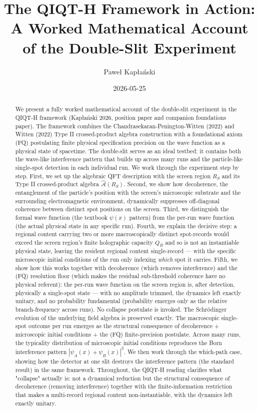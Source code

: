 \documentclass[11pt,a4paper]{article}
\title{The QIQT-H Framework in Action: A Worked Mathematical Account of the Double-Slit Experiment}
\author{Paweł Kapłański}
\date{2026-05-25}
\begin{document}
\maketitle

\begin{abstract}
\noindent We present a fully worked mathematical account of the double-slit experiment in the QIQT-H framework (Kapłański 2026, position paper and companion foundations paper). The framework combines the Chandrasekaran-Penington-Witten (2022) and Witten (2022) Type II crossed-product algebra construction with a foundational axiom (FQ) postulating finite physical specification precision on the wave function as a physical state of spacetime. The double-slit serves as an ideal testbed: it contains both the wave-like interference pattern that builds up across many runs and the particle-like single-spot detection in each individual run. We work through the experiment step by step. First, we set up the algebraic QFT description with the screen region $R_S$ and its Type II crossed-product algebra $\hat{\mathcal{A}}(R_S)$. Second, we show how decoherence, the entanglement of the particle's position with the screen's microscopic substrate and the surrounding electromagnetic environment, dynamically suppresses off-diagonal coherence between distinct spot positions on the screen. Third, we distinguish the formal wave function (the textbook $\psi(x)$ pattern) from the per-run wave function (the actual physical state in any specific run). Fourth, we explain the decisive step: a regional content carrying two or more macroscopically distinct spot-records would exceed the screen region's finite holographic capacity $Q_R$ and so is not an instantiable physical state, leaving the resident regional content single-record — with the specific microscopic initial conditions of the run only indexing \emph{which} spot it carries. Fifth, we show how this works together with decoherence (which removes interference) and the (FQ) resolution floor (which makes the residual sub-threshold coherence have no physical referent): the per-run wave function on the screen region is, after detection, physically a single-spot state — with no amplitude trimmed, the dynamics left exactly unitary, and no probability fundamental (probability emerges only as the relative branch-frequency across runs). No collapse postulate is invoked. The Schrödinger evolution of the underlying field algebra is preserved exactly. The macroscopic single-spot outcome per run emerges as the structural consequence of decoherence + microscopic initial conditions + the (FQ) finite-precision postulate. Across many runs, the typicality distribution of microscopic initial conditions reproduces the Born interference pattern $|\psi_A(x) + \psi_B(x)|^2$. We then work through the which-path case, showing how the detector at one slit destroys the interference pattern (the standard result) in the same framework. Throughout, the QIQT-H reading clarifies what "collapse" actually is: not a dynamical reduction but the structural consequence of decoherence (removing interference) together with the finite-information restriction that makes a multi-record regional content non-instantiable, with the dynamics left exactly unitary.



\end{abstract}
\end{document}
